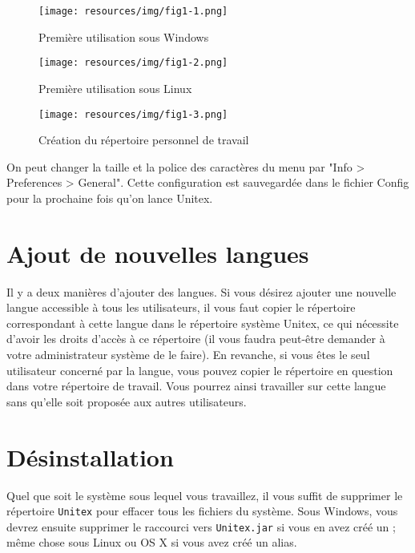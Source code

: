 \begin{figure}[!ht]
\begin{center}
\texttt{[image: resources/img/fig1-1.png]}
\caption{Première utilisation sous Windows}
\end{center}
\end{figure}

\begin{figure}[!ht]
\begin{center}
\texttt{[image: resources/img/fig1-2.png]}
\caption{Première utilisation sous Linux}
\end{center}
\end{figure}

\begin{figure}[!ht]
\begin{center}
\texttt{[image: resources/img/fig1-3.png]}
\caption{Création du répertoire personnel de travail
\label{fig-creation-personal-directory}}
\end{center}
\end{figure}

\bigskip
\noindent On peut changer la taille et la police des caractères du menu par "Info > Preferences > General". Cette configuration est sauvegardée dans le fichier Config pour la prochaine fois qu'on lance Unitex.

\section{Ajout de nouvelles langues}

\bigskip
\noindent Il y a deux manières d’ajouter des langues. Si vous désirez ajouter une nouvelle langue
accessible à tous les utilisateurs, il vous faut copier le répertoire correspondant à cette langue
dans le répertoire système Unitex,
ce qui nécessite d’avoir les droits d’accès à ce répertoire
(il vous faudra peut-être demander à votre administrateur système de le faire).
En revanche, si vous êtes le seul utilisateur concerné par la langue, vous pouvez copier le répertoire
en question dans votre répertoire de travail.
Vous pourrez ainsi travailler sur cette langue sans qu’elle soit proposée aux autres utilisateurs.



\section{Désinstallation}
Quel que soit le système sous lequel vous travaillez, il vous suffit de supprimer le répertoire
\verb+Unitex+ pour effacer tous les fichiers du système. Sous Windows, vous devrez ensuite supprimer
le raccourci vers \verb+Unitex.jar+  si vous en avez créé un ;
même chose sous Linux ou OS X si vous avez créé un alias.


